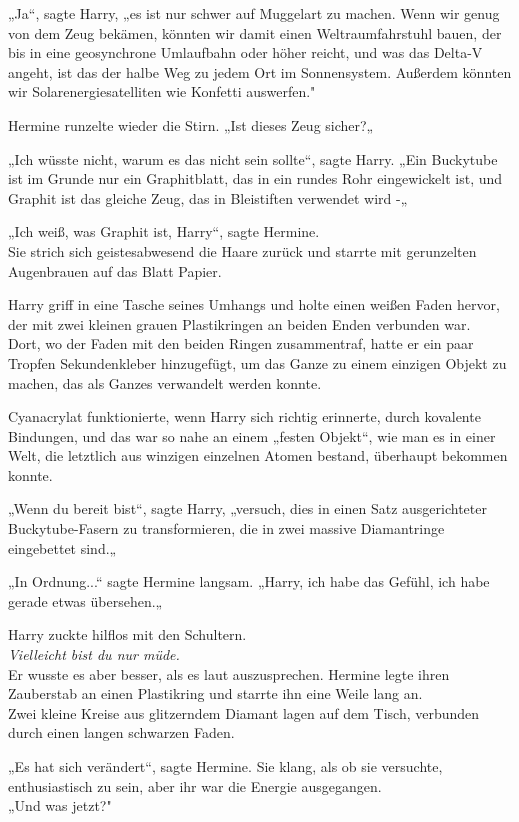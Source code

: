 {„Ja“, sagte Harry, „es ist nur schwer auf Muggelart zu machen. Wenn wir genug von dem Zeug bekämen, könnten wir damit einen Weltraumfahrstuhl bauen, der bis in eine geosynchrone Umlaufbahn oder höher reicht, und was das Delta-V angeht, ist das der halbe Weg zu jedem Ort im Sonnensystem. Außerdem könnten wir Solarenergiesatelliten wie Konfetti auswerfen."

Hermine runzelte wieder die Stirn. „Ist dieses Zeug sicher?„

„Ich wüsste nicht, warum es das nicht sein sollte“, sagte Harry. „Ein Buckytube ist im Grunde nur ein Graphitblatt, das in ein rundes Rohr eingewickelt ist, und Graphit ist das gleiche Zeug, das in Bleistiften verwendet wird -„

„Ich weiß, was Graphit ist, Harry“, sagte Hermine.\\ Sie strich sich geistesabwesend die Haare zurück und starrte mit gerunzelten Augenbrauen auf das Blatt Papier.

Harry griff in eine Tasche seines Umhangs und holte einen weißen Faden hervor, der mit zwei kleinen grauen Plastikringen an beiden Enden verbunden war.\\ Dort, wo der Faden mit den beiden Ringen zusammentraf, hatte er ein paar Tropfen Sekundenkleber hinzugefügt, um das Ganze zu einem einzigen Objekt zu machen, das als Ganzes verwandelt werden konnte.

Cyanacrylat funktionierte, wenn Harry sich richtig erinnerte, durch kovalente Bindungen, und das war so nahe an einem „festen Objekt“, wie man es in einer Welt, die letztlich aus winzigen einzelnen Atomen bestand, überhaupt bekommen konnte.

„Wenn du bereit bist“, sagte Harry, „versuch, dies in einen Satz ausgerichteter Buckytube-Fasern zu transformieren, die in zwei massive Diamantringe eingebettet sind.„

„In Ordnung...“ sagte Hermine langsam. „Harry, ich habe das Gefühl, ich habe gerade etwas übersehen.„

Harry zuckte hilflos mit den Schultern.\\ \emph{Vielleicht bist du nur müde.}\\ Er wusste es aber besser, als es laut auszusprechen. Hermine legte ihren Zauberstab an einen Plastikring und starrte ihn eine Weile lang an.\\ Zwei kleine Kreise aus glitzerndem Diamant lagen auf dem Tisch, verbunden durch einen langen schwarzen Faden.

„Es hat sich verändert“, sagte Hermine. Sie klang, als ob sie versuchte, enthusiastisch zu sein, aber ihr war die Energie ausgegangen.\\ „Und was jetzt?"

}
